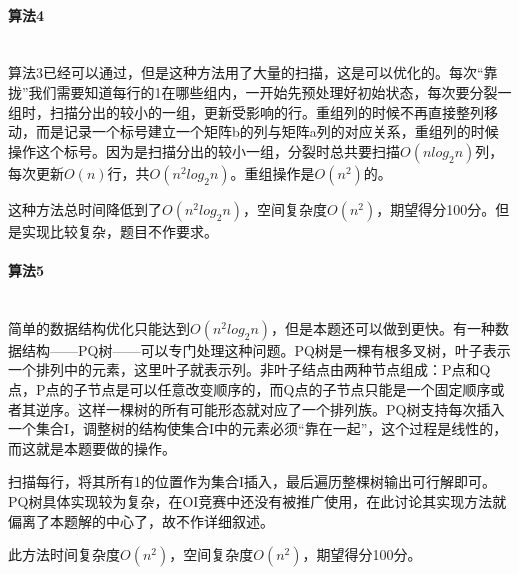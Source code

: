 \documentclass[UTF8]{ctexart}
\newcommand{\myparagraph}[1]{\paragraph{#1}\mbox{}\\}
\begin{document}
	\myparagraph{算法4}
		
		算法3已经可以通过，但是这种方法用了大量的扫描，这是可以优化的。每次“靠拢”我们需要知道每行的1在哪些组内，一开始先预处理好初始状态，每次要分裂一组时，扫描分出的较小的一组，更新受影响的行。重组列的时候不再直接整列移动，而是记录一个标号建立一个矩阵b的列与矩阵a列的对应关系，重组列的时候操作这个标号。因为是扫描分出的较小一组，分裂时总共要扫描$O(nlog_2n)$列，每次更新$O(n)$行，共$O(n^2log_2n)$。重组操作是$O(n^2)$的。
		
		这种方法总时间降低到了$O(n^2log_2n)$，空间复杂度$O(n^2)$，期望得分100分。但是实现比较复杂，题目不作要求。
		
	\myparagraph{算法5}
	
		简单的数据结构优化只能达到$O(n^2log_2n)$，但是本题还可以做到更快。有一种数据结构——PQ树——可以专门处理这种问题。PQ树是一棵有根多叉树，叶子表示一个排列中的元素，这里叶子就表示列。非叶子结点由两种节点组成：P点和Q点，P点的子节点是可以任意改变顺序的，而Q点的子节点只能是一个固定顺序或者其逆序。这样一棵树的所有可能形态就对应了一个排列族。PQ树支持每次插入一个集合I，调整树的结构使集合I中的元素必须“靠在一起”，这个过程是线性的，而这就是本题要做的操作。
		
		扫描每行，将其所有1的位置作为集合I插入，最后遍历整棵树输出可行解即可。PQ树具体实现较为复杂，在OI竞赛中还没有被推广使用，在此讨论其实现方法就偏离了本题解的中心了，故不作详细叙述。
		
		此方法时间复杂度$O(n^2)$，空间复杂度$O(n^2)$，期望得分100分。
	
\end{document}
